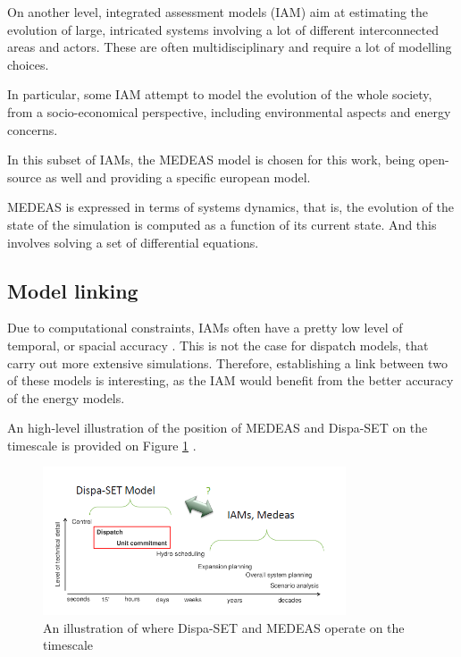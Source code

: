 On another level, integrated assessment models (IAM) aim at estimating the evolution of large, intricated systems involving a lot of different interconnected areas and actors. These are often multidisciplinary and require a lot of modelling choices.

In particular, some IAM attempt to model the evolution of the whole society, from a socio-economical perspective, including environmental aspects and energy concerns.

In this subset of IAMs, the MEDEAS model is chosen for this work, being open-source as well and providing a specific european model.

MEDEAS is expressed in terms of systems dynamics, that is, the evolution of the state of the simulation is computed as a function of its current state. And this involves solving a set of differential equations.

\subsection{Model linking}

Due to computational constraints, IAMs often have a pretty low level of temporal, or spacial accuracy \cite{linkings-stuff}. This is not the case for dispatch models, that carry out more extensive simulations. Therefore, establishing a link between two of these models is interesting, as the IAM would benefit from the better accuracy of the energy models. 

An high-level illustration of the position of MEDEAS and Dispa-SET on the timescale is provided on Figure \ref{fig:dispaset-medeas-timescale} \cite{dispaset}.

\begin{figure}[h]
    \centering
    \includegraphics[width=0.8\textwidth]{resources/images/dispaset-medeas-timescale.png}
    \caption{An illustration of where Dispa-SET and MEDEAS operate on the timescale}
    \label{fig:dispaset-medeas-timescale}
\end{figure}

